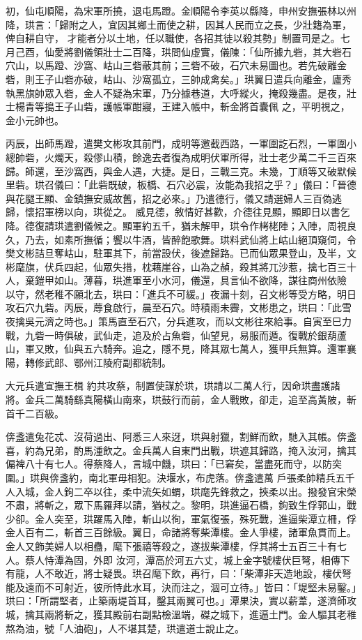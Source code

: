 \begin{pinyinscope}
 初，仙屯順陽，為宋軍所撓，退屯馬蹬。金順陽令李英以縣降，申州安撫張林以州降，珙言：「歸附之人，宜因其鄉土而使之耕，因其人民而立之長，少壯籍為軍，俾自耕自守，
 才能者分以土地，任以職使，各招其徒以殺其勢」制置司是之。七月己酉，仙愛將劉儀領壯士二百降，珙問仙虛實，儀陳：「仙所據九砦，其大砦石穴山，以馬蹬、沙窩、岵山三砦蔽其前；三砦不破，石穴未易圖也。若先破離金砦，則王子山砦亦破，岵山、沙窩孤立，三帥成禽矣。」珙翼日遣兵向離金，廬秀執黑旗帥眾入砦，金人不疑為宋軍，乃分據巷道，大呼縱火，掩殺幾盡。是夜，壯士楊青等搗王子山砦，護帳軍酣寢，王建入帳中，斬金將首囊佩
 之，平明視之，金小元帥也。



 丙辰，出師馬蹬，遣樊文彬攻其前門，成明等邀截西路，一軍圍訖石烈，一軍圍小總帥砦，火燭天，殺僇山積，餘逸去者復為成明伏軍所得，壯士老少萬二千三百來歸。師還，至沙窩西，與金人遇，大捷。是日，三戰三克。未幾，丁順等又破默候里砦。珙召儀曰：「此砦既破，板橋、石穴必震，汝能為我招之乎？」儀曰：「晉德與花腿王顯、金鎮撫安威故舊，招之必來。」乃遣德行，儀又請選婦人三百偽逃歸，懷招軍榜以向，珙從之。
 威見德，敘情好甚歡，介德往見顯，顯即日以書乞降。德復請珙遣劉儀候之。顯軍約五千，猶未解甲，珙令作栲栳陣；入陣，周視良久，乃去，如素所撫循；饗以牛酒，皆醉飽歌舞。珙料武仙將上岵山絕頂窺伺，令樊文彬詰旦奪岵山，駐軍其下，前當設伏，後遮歸路。已而仙眾果登山，及半，文彬麾旗，伏兵四起，仙眾失措，枕藉崖谷，山為之赬，殺其將兀沙惹，擒七百三十人，棄鎧甲如山。薄暮，珙進軍至小水河，儀還，具言仙不欲降，謀往商州依險
 以守，然老稚不願北去，珙曰：「進兵不可緩。」夜漏十刻，召文彬等受方略，明日攻石穴九砦。丙辰，蓐食啟行，晨至石穴。時積雨未霽，文彬患之，珙曰：「此雪夜擒吳元濟之時也。」策馬直至石穴，分兵進攻，而以文彬往來給事。自寅至巳力戰，九砦一時俱破，武仙走，追及於占魚砦，仙望見，易服而遁。復戰於銀葫蘆山，軍又敗，仙與五六騎奔。追之，隱不見，降其眾七萬人，獲甲兵無算。還軍襄陽，轉修武郎、鄂州江陵府副都統制。



 大元兵遣宣撫王楫
 約共攻蔡，制置使謀於珙，珙請以二萬人行，因命珙盡護諸將。金兵二萬騎繇真陽橫山南來，珙鼓行而前，金人戰敗，卻走，追至高黃陂，斬首千二百級。



 倴盞遣兔花忒、沒荷過出、阿悉三人來迓，珙與射獵，割鮮而飲，馳入其帳。倴盞喜，約為兄弟，酌馬湩飲之。金兵萬人自東門出戰，珙遮其歸路，掩入汝河，擒其偏裨八十有七人。得蔡降人，言城中饑，珙曰：「已窘矣，當盡死而守，以防突圍。」珙與倴盞約，南北軍毋相犯。決堰水，布虎落。倴盞遣萬
 戶張柔帥精兵五千人入城，金人鉤二卒以往，柔中流矢如蝟，珙麾先鋒救之，挾柔以出。撥發官宋榮不肅，將斬之，眾下馬羅拜以請，猶杖之。黎明，珙進逼石橋，鉤致生俘郭山，戰少卻。金人突至，珙躍馬入陣，斬山以徇，軍氣復張，殊死戰，進逼柴潭立柵，俘金人百有二，斬首三百餘級。翼日，命諸將奪柴潭樓。金人爭樓，諸軍魚貫而上。金人又飾美婦人以相蠱，麾下張禧等殺之，遂拔柴潭樓，俘其將士五百三十有七人。蔡人恃潭為固，外即
 汝河，潭高於河五六丈，城上金字號樓伏巨弩，相傳下有龍，人不敢近，將士疑畏。珙召麾下飲，再行，曰：「柴潭非天造地設，樓伏弩能及遠而不可射近，彼所恃此水耳，決而注之，涸可立待。」皆曰：「堤堅未易鑿。」珙曰：「所謂堅者，止築兩堤首耳，鑿其兩翼可也。」潭果決，實以薪葦，遂濟師攻城，擒其兩將斬之，獲其殿前右副點檢溫端，磔之城下，進逼土門。金人驅其老稚熬為油，號「人油砲」，人不堪其楚，珙遣道士說止之。




\end{pinyinscope}
